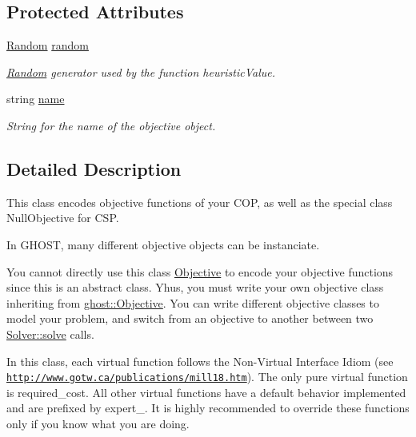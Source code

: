 \subsection*{Protected Attributes}
\begin{DoxyCompactItemize}
\item 
\hyperlink{classghost_1_1Random}{Random} \hyperlink{classghost_1_1Objective_a86081d1ebbab1fe6f781841d9ac8d546}{random}
\begin{DoxyCompactList}\small\item\em \hyperlink{classghost_1_1Random}{Random} generator used by the function heuristic\+Value. \end{DoxyCompactList}\item 
string \hyperlink{classghost_1_1Objective_af5bf0605c193884ad7f53593dabe8b85}{name}
\begin{DoxyCompactList}\small\item\em String for the name of the objective object. \end{DoxyCompactList}\end{DoxyCompactItemize}


\subsection{Detailed Description}
This class encodes objective functions of your C\+OP, as well as the special class Null\+Objective for C\+SP. 

In G\+H\+O\+ST, many different objective objects can be instanciate.

You cannot directly use this class \hyperlink{classghost_1_1Objective}{Objective} to encode your objective functions since this is an abstract class. Yhus, you must write your own objective class inheriting from \hyperlink{classghost_1_1Objective}{ghost\+::\+Objective}. You can write different objective classes to model your problem, and switch from an objective to another between two \hyperlink{classghost_1_1Solver_acc72c5a651e888858c10dfe300d96fa8}{Solver\+::solve} calls.

In this class, each virtual function follows the Non-\/\+Virtual Interface Idiom (see \href{http://www.gotw.ca/publications/mill18.htm}{\tt http\+://www.\+gotw.\+ca/publications/mill18.\+htm}). The only pure virtual function is required\+\_\+cost. All other virtual functions have a default behavior implemented and are prefixed by \textquotesingle{}expert\+\_\+\textquotesingle{}. It is highly recommended to override these functions only if you know what you are doing.

